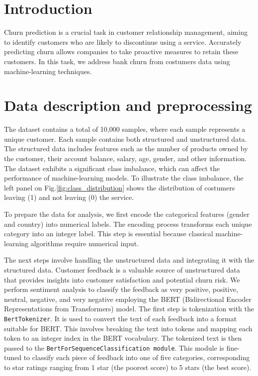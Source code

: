 \documentclass[12pt]{article}
\begin{document}
\section{Introduction}
Churn prediction is a crucial task in customer relationship management, aiming to identify customers who are likely to discontinue using a service. Accurately predicting churn allows companies to take proactive measures to retain these customers. In this task, we address bank churn from costumers data using machine-learning techniques. 

\section{Data description and preprocessing}
The dataset contains a total of 10,000 samples, where each sample represents a unique customer. Each sample contains both structured and unstructured data. The structured data includes features such as the number of products owned by the customer, their account balance, salary, age, gender, and other information. The dataset exhibits a significant class imbalance, which can affect the performance of machine-learning models. To illustrate the class imbalance, the left panel on Fig.\ref{fig:class_distribution} shows the distribution of costumers leaving (1) and not leaving (0) the service. 

To prepare the data for analysis, we first encode the categorical features (gender and country) into numerical labels. The encoding process transforms each unique category into an integer label. This step is essential because classical machine-learning algorithms require numerical input. 

The next steps involve handling the unstructured data and integrating it with the structured data. Customer feedback is a valuable source of unstructured data that provides insights into customer satisfaction and potential churn risk.  We perform sentiment analysis to classify the feedback as very positive, positive, neutral, negative, and very negative employing the \textsc{BERT} (Bidirectional Encoder Representations from Transformers) model. The first step is tokenization with the \texttt{BertTokenizer}. It is used to convert the text of each feedback into a format suitable for \textsc{BERT}. This involves breaking the text into tokens and mapping each token to an integer index in the \textsc{BERT} vocabulary. The tokenized text is then passed to the \texttt{BertForSequenceClassification module}. This module is fine-tuned to classify each piece of feedback into one of five categories, corresponding to star ratings ranging from 1 star (the poorest score) to 5 stars (the best score).
\end{document}
